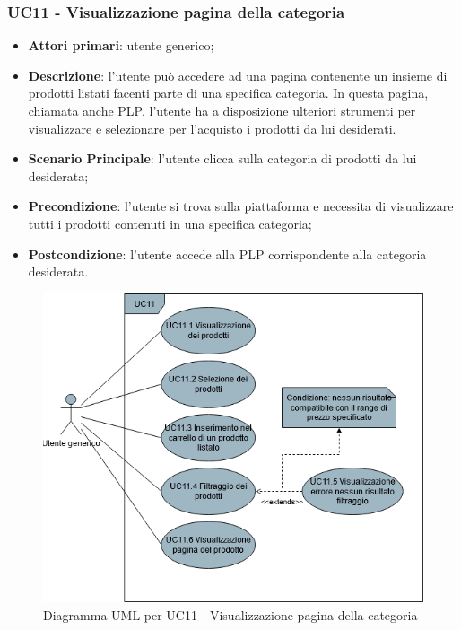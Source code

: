 \subsubsection{UC11 - Visualizzazione pagina della categoria}
\begin{itemize}
\item \textbf{Attori primari}: utente generico;
\item \textbf{Descrizione}: l'utente può accedere ad una pagina contenente un insieme di prodotti listati facenti parte di una specifica categoria. In questa pagina, chiamata anche PLP, l'utente ha a disposizione ulteriori strumenti per visualizzare e selezionare per l'acquisto i prodotti da lui desiderati.
\item \textbf{Scenario Principale}: l'utente clicca sulla categoria di prodotti da lui desiderata;
\item \textbf{Precondizione}: l'utente si trova sulla piattaforma e necessita di visualizzare tutti i prodotti contenuti in una specifica categoria;
\item \textbf{Postcondizione}: l'utente accede alla PLP corrispondente alla categoria desiderata.
\end{itemize}
\begin{figure}[H]
\centering
\includegraphics[scale=0.6]{res/UseCase/Immagini/VisualizzazionePaginaCategoria}
\caption{Diagramma UML per UC11 - Visualizzazione pagina della categoria}
\end{figure}